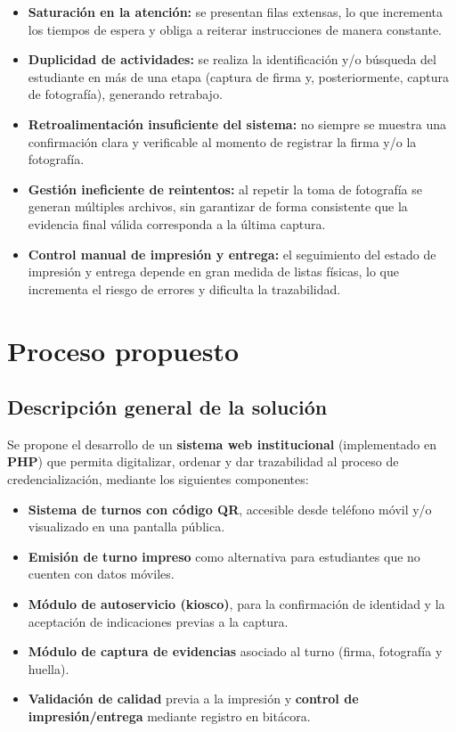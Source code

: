 \documentclass[12pt,a4paper]{article}
\begin{document}
\begin{itemize}
  \item \textbf{Saturación en la atención:} se presentan filas extensas, lo que incrementa los tiempos de espera y obliga a reiterar instrucciones de manera constante.
  \item \textbf{Duplicidad de actividades:} se realiza la identificación y/o búsqueda del estudiante en más de una etapa (captura de firma y, posteriormente, captura de fotografía), generando retrabajo.
  \item \textbf{Retroalimentación insuficiente del sistema:} no siempre se muestra una confirmación clara y verificable al momento de registrar la firma y/o la fotografía.
  \item \textbf{Gestión ineficiente de reintentos:} al repetir la toma de fotografía se generan múltiples archivos, sin garantizar de forma consistente que la evidencia final válida corresponda a la última captura.
  \item \textbf{Control manual de impresión y entrega:} el seguimiento del estado de impresión y entrega depende en gran medida de listas físicas, lo que incrementa el riesgo de errores y dificulta la trazabilidad.
\end{itemize}
\newpage
\section{Proceso propuesto}

\subsection{Descripción general de la solución}
Se propone el desarrollo de un \textbf{sistema web institucional} (implementado en \textbf{PHP}) que permita digitalizar, ordenar y dar trazabilidad al proceso de credencialización, mediante los siguientes componentes:

\begin{itemize}
  \item \textbf{Sistema de turnos con código QR}, accesible desde teléfono móvil y/o visualizado en una pantalla pública.
  \item \textbf{Emisión de turno impreso} como alternativa para estudiantes que no cuenten con datos móviles.
  \item \textbf{Módulo de autoservicio (kiosco)}, para la confirmación de identidad y la aceptación de indicaciones previas a la captura.
  \item \textbf{Módulo de captura de evidencias} asociado al turno (firma, fotografía y huella).
  \item \textbf{Validación de calidad} previa a la impresión y \textbf{control de impresión/entrega} mediante registro en bitácora.
\end{itemize}
\end{document}
